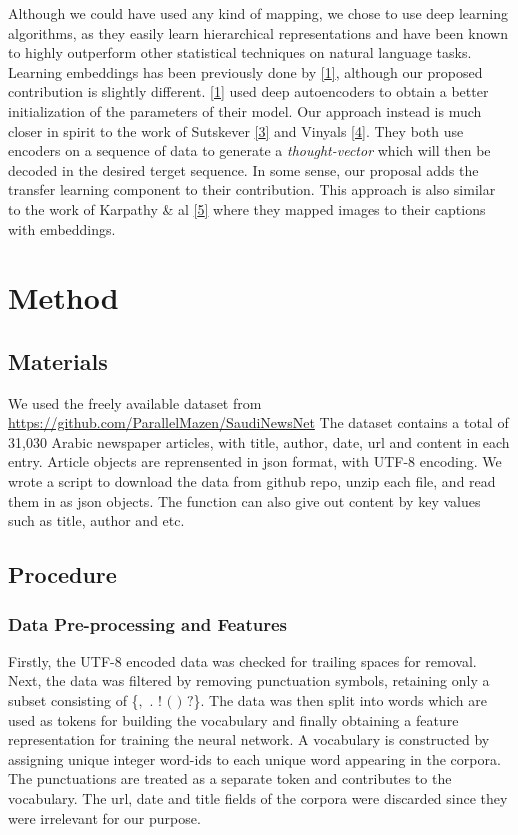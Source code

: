 \documentclass[12pt]{article}
\begin{document}
Although we could have used any kind of mapping, we chose to use deep
learning algorithms, as they easily learn hierarchical representations
and have been known to highly outperform other statistical techniques on
natural language tasks. Learning embeddings has been previously done by
\href{References}{{[}1{]}}, although our proposed contribution is
slightly different. \href{References}{{[}1{]}} used deep autoencoders to
obtain a better initialization of the parameters of their model. Our
approach instead is much closer in spirit to the work of Sutskever
\href{References}{{[}3{]}} and Vinyals \href{References}{{[}4{]}}. They
both use encoders on a sequence of data to generate a
\emph{thought-vector} which will then be decoded in the desired terget
sequence. In some sense, our proposal adds the transfer learning
component to their contribution. This approach is also similar to the
work of Karpathy \& al \href{References}{{[}5{]}} where they mapped
images to their captions with embeddings.

\section{Method}\label{method}
\subsection{Materials}
We used the freely available dataset from
\url{https://github.com/ParallelMazen/SaudiNewsNet} The dataset contains
a total of 31,030 Arabic newspaper articles, with title, author, date,
url and content in each entry. Article objects are reprensented in json
format, with UTF-8 encoding. We wrote a script to download the data from
github repo, unzip each file, and read them in as json objects. The
function can also give out content by key values such as title, author
and etc.

\subsection{Procedure}\label{procedure}

\subsubsection{Data Pre-processing and Features}

Firstly, the UTF-8 encoded data was checked for trailing spaces for removal. Next, the data was filtered by removing punctuation symbols, retaining only a subset consisting of \{$,$ $.$ $!$ $($ $)$ $?$\}. The data was then split into words which are used as tokens for building the vocabulary and finally obtaining a feature representation for training the neural network. A vocabulary is constructed by assigning unique integer word-ids to each unique word appearing in the corpora. The punctuations are treated as a separate token and contributes to the vocabulary. The url, date and title fields of the corpora were discarded since they were irrelevant for our purpose.  
\end{document}

